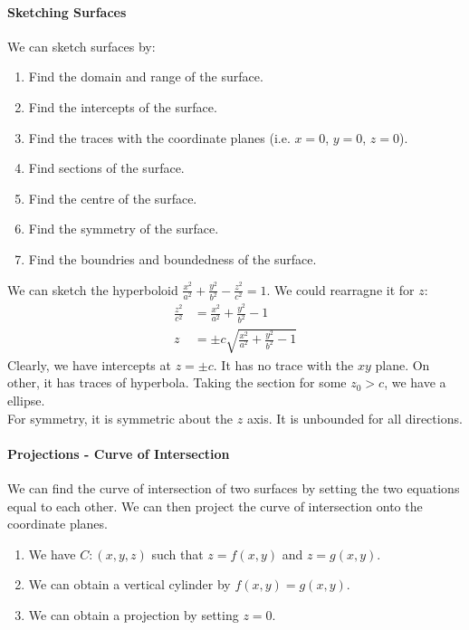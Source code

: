 \documentclass[11pt]{report}
\begin{document}
\paragraph{Sketching Surfaces} We can sketch surfaces by:
\begin{enumerate}
    \item Find the domain and range of the surface.
    \item Find the intercepts of the surface.
    \item Find the traces with the coordinate planes (i.e. $x=0$, $y=0$, $z=0$).
    \item Find sections of the surface.
    \item Find the centre of the surface.
    \item Find the symmetry of the surface.
    \item Find the boundries and boundedness of the surface.
\end{enumerate}
\begin{example}[Hyperboloid]
    We can sketch the hyperboloid $\frac{x^2}{a^2} + \frac{y^2}{b^2} - \frac{z^2}{c^2} = 1$. We could rearragne it for $z$:
    \begin{align*}
        \frac{z^2}{c^2} &= \frac{x^2}{a^2} + \frac{y^2}{b^2} - 1 \\
        z &= \pm c \sqrt{\frac{x^2}{a^2} + \frac{y^2}{b^2} - 1}
    \end{align*}
    Clearly, we have intercepts at $z = \pm c$. It has no trace with the $xy$ plane. On other, it has traces of hyperbola. Taking the section for some $z_0 > c$, we have a ellipse.\\
    For symmetry, it is symmetric about the $z$ axis. It is unbounded for all directions.
\end{example}
\paragraph{Projections - Curve of Intersection} We can find the curve of intersection of two surfaces by setting the two equations equal to each other. We can then project the curve of intersection onto the coordinate planes.
\begin{enumerate}
    \item We have $C: (x, y, z)$ such that $z = f(x, y)$ and $z = g(x, y)$.
    \item We can obtain a vertical cylinder by $f(x, y) = g(x, y)$.
    \item We can obtain a projection by setting $z = 0$.
\end{enumerate}
\end{document}
